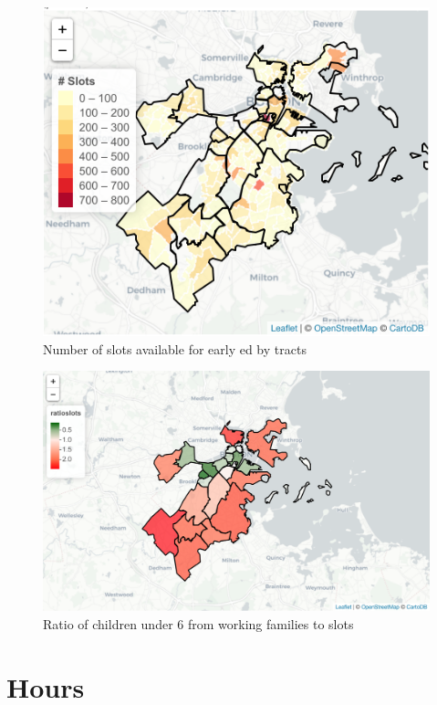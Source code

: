\documentclass[10pt,letterpaper]{article}
\begin{document}
\begin{figure}

{\centering \includegraphics[width=0.9\linewidth]{fig2_capacitytractsupply} 

}

\caption{Number of slots available for early ed by tracts}\label{fig:unnamed-chunk-2}
\end{figure}

\begin{figure}

{\centering \includegraphics[width=1\linewidth]{fig3} 

}

\caption{Ratio of children under 6 from working families to slots}\label{fig:unnamed-chunk-3}
\end{figure}

\section{Hours}\label{hours}
\end{document}
